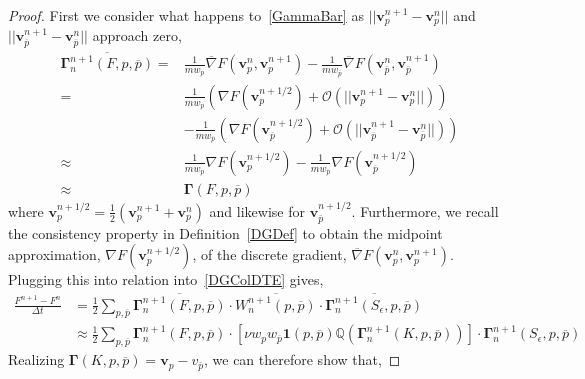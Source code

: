 \documentclass[preprint,12pt]{elsarticle}
\theoremstyle{definition}
\begin{document}
\begin{proof}
First we consider what happens to~\eqref{GammaBar} as $||\boldsymbol{v}_{p}^{n+1} - \boldsymbol{v}_{p}^{n}||$ and $||\boldsymbol{v}_{\overline{p}}^{n+1} - \boldsymbol{v}_{\overline{p}}^{n}||$ approach zero, 
\begin{align*}
\overline{\boldsymbol{\Gamma}_{n}^{n+1}(F, p, \overline{p})}=&\frac{1}{m w_{p}} \overline{\nabla} F (\boldsymbol{v}_{p}^{n},\boldsymbol{v}_{p}^{n+1})-\frac{1}{m w_{\overline{p}}} \overline{\nabla} F (\boldsymbol{v}_{\overline{p}}^{n},\boldsymbol{v}_{\overline{p}}^{n+1})\\
= &\frac{1}{m w_{p}} \left( \nabla F \left( \boldsymbol{v}_{p}^{n+1/2} \right) + \mathcal{O} (||\boldsymbol{v}_{p}^{n+1} - \boldsymbol{v}_{p}^{n}||) \right) \\
&- \frac{1}{m w_{\overline{p}}} \left( \nabla F \left( \boldsymbol{v}_{\overline{p}}^{n+1/2} \right) + \mathcal{O} (||\boldsymbol{v}_{\overline{p}}^{n+1} - \boldsymbol{v}_{\overline{p}}^{n}||) \right)\\
\approx &\frac{1}{m w_{p}} \nabla F \left( \boldsymbol{v}_{p}^{n+1/2} \right) - \frac{1}{m w_{\overline{p}}} \nabla F \left( \boldsymbol{v}_{\overline{p}}^{n+1/2} \right)\\
\approx & \boldsymbol{\Gamma} (F, p, \overline{p})
\end{align*}
where $\boldsymbol{v}_p^{n+1/2}=\frac{1}{2}\left(\boldsymbol{v}_p^{n+1}+\boldsymbol{v}_p^{n}\right)$ and likewise for $\boldsymbol{v}_{\bar{p}}^{n+1/2}$. Furthermore, we recall the consistency property in Definition~\eqref{DGDef} to obtain the midpoint approximation, $\nabla F(\boldsymbol{v}_p^{n+1/2})$, of the discrete gradient, $\overline{\nabla} F (\boldsymbol{v}_{p}^{n},\boldsymbol{v}_{p}^{n+1})$. Plugging this into relation into~\eqref{DGColDTE} gives,
\begin{align*}
\frac{F^{n+1} - F^{n}}{\Delta t} &= \frac{1}{2} \sum_{p,\overline{p}} \overline{\boldsymbol{\Gamma}^{n+1}_{n} (F,p,\overline{p})} \cdot \overline{W^{n+1}_{n} (p,\overline{p})} \cdot \overline{\boldsymbol{\Gamma}^{n+1}_{n} (S_{\epsilon},p,\overline{p})} \\
&\approx \frac{1}{2} \sum_{p,\overline{p}} \boldsymbol{\Gamma}^{n+1}_{n} (F,p,\overline{p}) \cdot \left[ \nu w_{p} w_{\overline{p}} \boldsymbol{1}(p, \overline{p}) \mathbb{Q}\left(\boldsymbol{\Gamma}_{n}^{n+1}(K, p, \overline{p})\right) \right] \cdot \boldsymbol{\Gamma}^{n+1}_{n} (S_{\epsilon},p,\overline{p})
\end{align*}
Realizing $\boldsymbol{\Gamma}(K,p,\overline{p}) = \boldsymbol{v}_p - v_{\overline{p}}$, we can therefore show that,

\end{proof}
\end{document}
